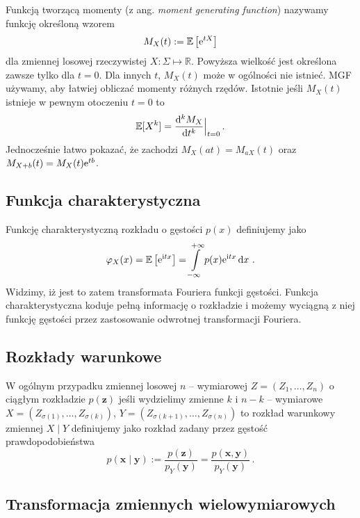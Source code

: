 \documentclass{myclass}
\begin{document}
Funkcją tworzącą momenty (z ang. \textit{moment generating function}) nazywamy funkcję określoną
wzorem
\begin{equation*}
    M_X(t) := \mathbb{E}\left[\mathrm{e}^{t X}\right]
\end{equation*}
dla zmiennej losowej rzeczywistej \(X: \Sigma \mapsto \mathbb{R}\). Powyższa wielkość jest określona
zawsze tylko dla \(t=0\). Dla innych \(t\), \(M_X(t)\) może w ogólności nie istnieć. MGF używamy,
aby łatwiej obliczać momenty różnych rzędów. Istotnie jeśli \(M_X(t)\) istnieje w pewnym otoczeniu
\(t=0\) to
\begin{equation*}
    \mathbb{E}[X^k] = \dv[k]{M_X}{t}\Big|_{t=0}\,.
\end{equation*}
Jednocześnie łatwo pokazać, że zachodzi \(M_X(at) = M_{aX}(t)\) oraz \(M_{X+b}(t) = M_X(t)\mathrm{e}^{tb}\).

\subsection{Funkcja charakterystyczna}

Funkcję charakterystyczną rozkładu o gęstości \(p(x)\) definiujemy jako
\begin{equation*}
    \varphi_X(x) = \mathbb{E}\left[\mathrm{e}^{\mathrm{i} t x}\right] = \int\limits_{-\infty}^{+\infty} p(x)\mathrm{e}^{\mathrm{i} tx} \dd{x}\,.
\end{equation*}
Widzimy, iż jest to zatem transformata Fouriera funkcji gęstości. Funkcja charakterystyczna koduje
pełną informację o rozkładzie i możemy wyciągną z niej funkcję gęstości przez zastosowanie odwrotnej
transformacji Fouriera.

\subsection{Rozkłady warunkowe}

W ogólnym przypadku zmiennej losowej \(n\) -- wymiarowej \(Z = (Z_1, \ldots, Z_n)\) o ciągłym
rozkładzie \(p(\mathbf{z})\) jeśli wydzielimy zmienne \(k\) i \(n-k\) -- wymiarowe \(X =
(Z_{\sigma(1)}, \ldots, Z_{\sigma(k)})\), \(Y = (Z_{\sigma(k+1)}, \ldots, Z_{\sigma(n)})\) to
rozkład warunkowy zmiennej \(X \mid Y\) definiujemy jako rozkład zadany przez gęstość
prawdopodobieństwa
\begin{equation*}
    p(\mathbf{x} \mid \mathbf{y}) := \frac{p(\mathbf{z})}{p_Y(\mathbf{y})} = \frac{p(\mathbf{x},\mathbf{y})}{p_Y(\mathbf{y})}\,.
\end{equation*}

\subsection{Transformacja zmiennych wielowymiarowych}
\end{document}
